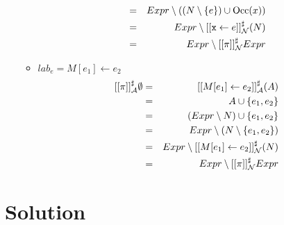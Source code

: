 \documentclass[a4paper]{article}
\begin{document}
\begin{itemize}
\begin{itemize}
\begin{eqnarray*}
        &=& Expr \setminus ((N \setminus \{ e \}) \cup \mathrm{Occ}(x)) \\
        &=& Expr \setminus [[\texttt{x} \leftarrow e]]^\sharp_{\mathcal{N}}(N) \\
        &=& Expr \setminus [[\pi]]^\sharp_{\mathcal{N}} Expr \\
    \end{eqnarray*}
    \item $ lab_e = M[e_1] \leftarrow e_2 $
    \begin{eqnarray*}
      [[\pi]]^\sharp_{\mathcal{A}} \emptyset &=& [[M[e_1] \leftarrow e_2 ]]^\sharp_{\mathcal{A}}(A) \\
        &=& A \cup \{ e_1, e_2 \} \\
        &=& (Expr \setminus N) \cup \{ e_1, e_2 \} \\
        &=& Expr \setminus (N \setminus \{ e_1, e_2 \}) \\
        &=& Expr \setminus [[M[e_1] \leftarrow e_2]]^\sharp_{\mathcal{N}}(N) \\
        &=& Expr \setminus [[\pi]]^\sharp_{\mathcal{N}} Expr \\
    \end{eqnarray*}
  \end{itemize}
\end{itemize}

\section{Solution}
\end{document}
